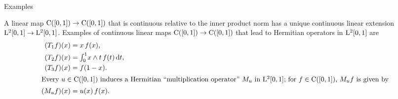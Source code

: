 \documentclass[main.tex]{subfiles}
\begin{document}
\begin{psec}{5.5}{Examples}
\begin{enumerate}
A linear map $\mathrm{C}([0,1])\rightarrow\mathrm{C}([0,1])$
that is continuous relative to the inner product norm
has a unique continuous linear extension
$\mathrm{L}^2[0,1]\rightarrow\mathrm{L}^2[0,1]$.
Examples of continuous linear maps
$\mathrm{C}([0,1])\rightarrow\mathrm{C}([0,1])$ that
lead to Hermitian operators in $\mathrm{L}^2[0,1]$ are
\begin{align*}
(T_1 f)(x) &= x\,f(x)\htam{,} \\
(T_2 f)(x) &= \textstyle{\int_0^1} x\wedge t\,f(t)\,\mathrm{d}t \htam{,} \\
(T_3 f)(x) &= f(1-x)\htam{.} \\%
\intertext{%
Every $u\in\Cont{[0,1]}$ induces a Hermitian 
``multiplication operator''~$M_u$
in $\Leb^2[0,1]$;
for $f\in \Cont{[0,1]}$,
$M_uf$ is given by
}%
(M_uf)(x) &= u(x)\,f(x)\htam{.}
\end{align*}
\end{enumerate}
\end{psec}
\clearpage
\end{document}
